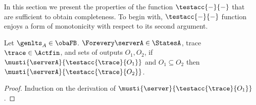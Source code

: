 {\iffalse
\begin{lemma}
\label{lem:wta-preserves-da}
For every $\mu.\trace \in \Actfin$ and $\state \in \States$,
\begin{enumerate}
\item %
  if $ \state \wta{ \mu } \stateA $ then $\accht{ \stateA }{\trace} \subseteq \accht{ \state }{\mu.\trace}$,
\item\label{pt:da-output-shift} %
  $\accht{\state}{\mu.\trace} \subseteq \accht{ \state \Par \mailbox{ \co{\mu} } }{\trace} $.
\end{enumerate}
\end{lemma}
\fi


In this section we present the properties of the function $\testacc{-}{-}$
that are sufficient to obtain completeness.
To begin with, $\testacc{-}{-}$ function enjoys a form of monotonicity with respect to its second argument.

\begin{lemma}
  \label{lem:tacc-monotonicity}
  \label{lem:must-f-gen-a-subseteq}
  Let $\genlts_A \in \obaFB$.
  $\Forevery \serverA \in \StatesA$, trace $\trace \in \Actfin$, and sets of outputs $O_1, O_2$,
  if $\musti{\serverA}{\testacc{\trace}{O_1}}$
  and $O_1 \subseteq O_2$ then
  $\musti{\serverA}{\testacc{\trace}{O_2}}$.
\end{lemma}
\begin{proof}
  Induction on the derivation of $\musti{ \server }{\testacc{ \trace }{ O_1 }}$.
\end{proof}

}

